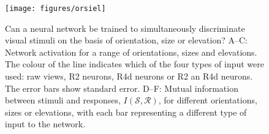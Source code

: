 \begin{figure}
\centering
\texttt{[image: figures/orsiel]}
\caption{Can a neural network be trained to simultaneously discriminate visual stimuli on the basis of orientation, size or elevation?
A--C: Network activation for a range of orientations, sizes and elevations. The colour of the line indicates which of the four types of input were used: raw views, R2 neurons, R4d neurons or R2 an R4d neurons. The error bars show standard error.
D--F: Mutual information between stimuli and responses, $I(\mathcal{S},\mathcal{R})$, for different orientations, sizes or elevations, with each bar representing a different type of input to the network.}
\label{fig:orsiel}
\end{figure}

